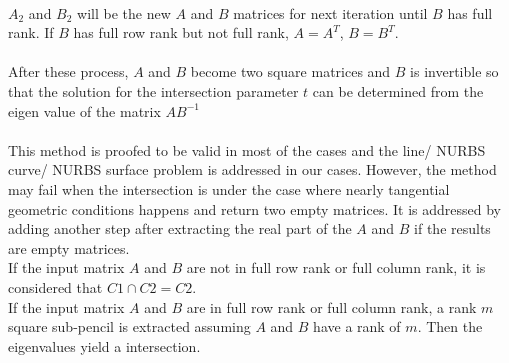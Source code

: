 \paragraph{}
$A_2$ and $B_2$ will be the new $A$ and $B$ matrices for next iteration until $B$ has full rank. If $B$ has full row rank but not full rank, $A=A^T$, $B=B^T$.
\paragraph{}
After these process, $A$ and $B$ become two square matrices and $B$ is invertible so that the solution for the intersection parameter $t$ can be determined from the eigen value of the matrix $AB^{-1}$
\paragraph{}
This method is proofed to be valid in most of the cases and the line/ NURBS curve/ NURBS surface problem is addressed in our cases. However, the method may fail when the intersection is under the case where nearly tangential geometric conditions happens and return two empty matrices. It is addressed by adding another step after extracting the real part of the $A$ and $B$ if the results are empty matrices\cite{Shen2016}.\\
If the input matrix $A$ and $B$ are not in full row rank or full column rank, it is considered that $C1 \cap C2 = C2$.\\
If the input matrix $A$ and $B$ are in full row rank or full column rank, a rank $m$ square sub-pencil is extracted assuming $A$ and $B$ have a rank of $m$. Then the eigenvalues yield a intersection.